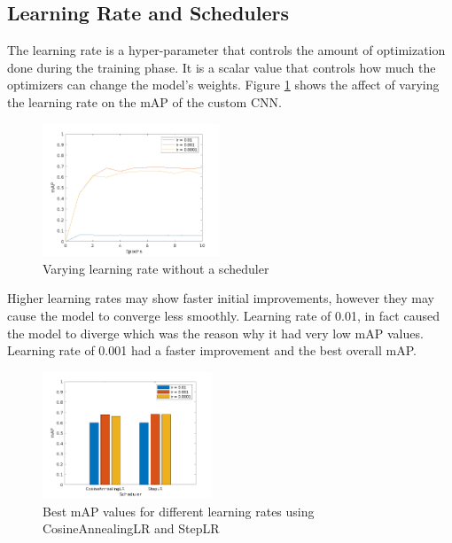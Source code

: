 \documentclass[10pt,twocolumn,letterpaper]{article}
\begin{document}
\subsection{Learning Rate and Schedulers}

The learning rate is a hyper-parameter that controls the amount of optimization done during the training phase.
It is a scalar value that controls how much the optimizers can change the model's weights.
Figure \ref{fig:learning_rate_comparison} shows the affect of varying the learning rate on the mAP of the
custom CNN.


\begin{figure}[H]
  \begin{center}
    \includegraphics[width=0.47\textwidth]{./assets/learning_rate_comparison.png}
    \captionsetup{justification=centering}
    \caption{Varying learning rate without a scheduler}
    \label{fig:learning_rate_comparison}
  \end{center}
\end{figure}

Higher learning rates may show faster initial improvements, however they may cause the model to converge less smoothly.
Learning rate of 0.01, in fact caused the model to diverge which was the reason why it had very low mAP values. Learning
rate of 0.001 had a faster improvement and the best overall mAP.

\begin{figure}[H]
  \begin{center}
\includegraphics[width=0.45\textwidth]{./assets/learning_rate_w_scheduler_comparison.png}
    \captionsetup{justification=centering}
    \caption{Best mAP values for different learning rates using CosineAnnealingLR and StepLR}
    \label{fig:learning_rate_w_scheduler}
  \end{center}
\end{figure}
\end{document}
